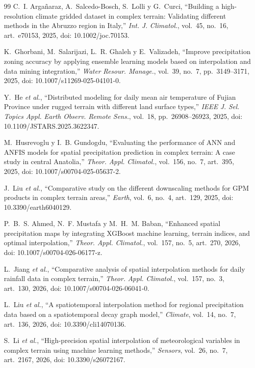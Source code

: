 \documentclass[conference]{IEEEtran}
\begin{document}
\begin{thebibliography}{99}
C.~I. Argañaraz, A.~Salcedo-Bosch, S.~Lolli y G.~Curci, ``Building a high-resolution climate gridded dataset in complex terrain: Validating different methods in the Abruzzo region in Italy,'' \textit{Int. J. Climatol.}, vol.~45, no.~16, art.~e70153, 2025, doi: 10.1002/joc.70153.

K.~Ghorbani, M.~Salarijazi, L.~R. Ghaleh y E.~Valizadeh, ``Improve precipitation zoning accuracy by applying ensemble learning models based on interpolation and data mining integration,'' \textit{Water Resour. Manage.}, vol.~39, no.~7, pp.~3149--3171, 2025, doi: 10.1007/s11269-025-04101-0.

Y.~He \textit{et al.}, ``Distributed modeling for daily mean air temperature of Fujian Province under rugged terrain with different land surface types,'' \textit{IEEE J. Sel. Topics Appl. Earth Observ. Remote Sens.}, vol.~18, pp.~26908--26923, 2025, doi: 10.1109/JSTARS.2025.3622347.

M.~Husrevoglu y I.~B. Gundogdu, ``Evaluating the performance of ANN and ANFIS models for spatial precipitation prediction in complex terrain: A case study in central Anatolia,'' \textit{Theor. Appl. Climatol.}, vol.~156, no.~7, art.~395, 2025, doi: 10.1007/s00704-025-05637-2.

J.~Liu \textit{et al.}, ``Comparative study on the different downscaling methods for GPM products in complex terrain areas,'' \textit{Earth}, vol.~6, no.~4, art.~129, 2025, doi: 10.3390/earth6040129.

P.~B.~S. Ahmed, N.~F. Mustafa y M.~H.~M. Baban, ``Enhanced spatial precipitation maps by integrating XGBoost machine learning, terrain indices, and optimal interpolation,'' \textit{Theor. Appl. Climatol.}, vol.~157, no.~5, art.~270, 2026, doi: 10.1007/s00704-026-06177-z.

L.~Jiang \textit{et al.}, ``Comparative analysis of spatial interpolation methods for daily rainfall data in complex terrain,'' \textit{Theor. Appl. Climatol.}, vol.~157, no.~3, art.~130, 2026, doi: 10.1007/s00704-026-06041-0.

L.~Liu \textit{et al.}, ``A spatiotemporal interpolation method for regional precipitation data based on a spatiotemporal decay graph model,'' \textit{Climate}, vol.~14, no.~7, art.~136, 2026, doi: 10.3390/cli14070136.

S.~Li \textit{et al.}, ``High-precision spatial interpolation of meteorological variables in complex terrain using machine learning methods,'' \textit{Sensors}, vol.~26, no.~7, art.~2167, 2026, doi: 10.3390/s26072167.


\end{thebibliography}
\end{document}
